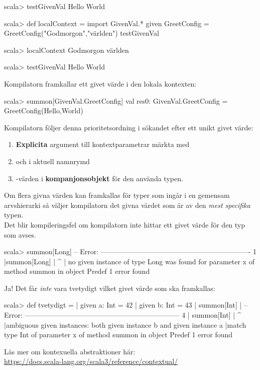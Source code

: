 \begin{REPL}
scala> testGivenVal
Hello World

scala> def localContext =
         import GivenVal.*
         given GreetConfig = GreetConfig("Godmorgon","världen")
         testGivenVal

scala> localContext
Godmorgon världen

scala> testGivenVal
Hello World
\end{REPL}


\SubtaskSolved  Kompilatorn framkallar ett givet värde i den lokala kontexten:
\begin{REPL}
scala> summon[GivenVal.GreetConfig]
val res0: GivenVal.GreetConfig = GreetConfig(Hello,World)
\end{REPL}
Kompilatorn följer denna prioritetsordning i sökandet efter ett unikt givet värde:
\begin{enumerate}
\item \textbf{Explicita} argument till kontextparametrar märkta med 
\item {} och  i aktuell namnrymd  
\item {}-värden i \textbf{kompanjonsobjekt} för den använda typen.
\end{enumerate}
Om flera givna värden kan framkallas för typer som ingår i en gemensam arvshierarki så väljer kompilatorn det givna värdet som är av den \emph{mest specifika} typen.\\

\SubtaskSolved Det blir kompileringsfel om kompilatorn inte hittar ett givet värde för den typ som avses.

\begin{REPL}
scala> summon[Long]
-- Error: ----------------------------------------------------------------
1 |summon[Long]
  |            ^
  |            no given instance of type Long was found for parameter x of 
               method summon in object Predef
1 error found
\end{REPL}

\SubtaskSolved Ja! Det får \emph{inte} vara tvetydigt vilket givet värde som ska framkallas:
\begin{REPL}
scala> def tvetydigt =
     |   given a: Int = 42
     |   given b: Int = 43
     |   summon[Int]
     | 
-- Error: ------------------------------------------------------------------
4 |  summon[Int]
  |             ^
  |ambiguous given instances: both given instance b and given instance a 
  |match type Int of parameter x of method summon in object Predef
1 error found

\end{REPL}
Läs mer om kontexuella abstraktioner här:\\\url{https://docs.scala-lang.org/scala3/reference/contextual/}


